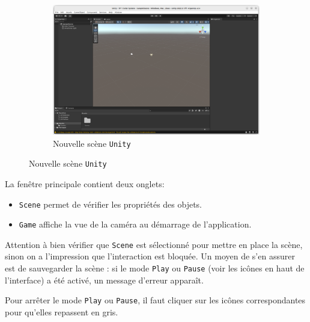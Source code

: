 \documentclass[a4paper,10pt]{article}
\newenvironment{solution}%
{\begin{tcolorbox}[breakable,colback=red!5!white,colframe=red!75!black,title=Solution]}%
{\end{tcolorbox}}
\newenvironment{attention}%
{\begin{tcolorbox}[breakable,colback=green!25!white,colframe=red!55!black,title=Attention]}%
{\end{tcolorbox}}
\begin{document}
\begin{figure}[h]
	\begin{subfigure}{\textwidth}
		\begin{center}
			\includegraphics[scale=.30]{fig/new-Unity-scene}
			\caption{Nouvelle scène \texttt{Unity}}
			\label{fig:new-Unity-scene}
		\end{center}
	\end{subfigure}
\end{figure}

\fi 

\ifversionenseignant
\begin{solution}
La fenêtre principale contient deux onglets:
\begin{itemize}
	\item \texttt{Scene} permet de vérifier les propriétés des objets. 
	\item \texttt{Game} affiche la vue de la caméra au démarrage de l'application.	
\end{itemize} 

Attention à bien vérifier que \texttt{Scene} est sélectionné pour mettre en place la scène, sinon on a l'impression que l'interaction est bloquée. Un moyen de s'en assurer est de sauvegarder la scène : si le mode \texttt{Play} ou \texttt{Pause} (voir les icônes en haut de l'interface) a été activé, un message d'erreur apparaît.

Pour arrêter le mode \texttt{Play} ou \texttt{Pause}, il faut cliquer sur les icônes correspondantes pour qu'elles repassent en gris.
\end{solution}
\fi 

%	
\end{document}
